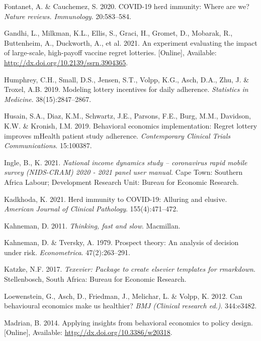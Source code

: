 \documentclass[11pt,preprint, authoryear]{elsarticle}
\numberwithin{equation}{section}
\numberwithin{figure}{section}
\numberwithin{table}{section}
\newlength{\cslhangindent}
\newenvironment{CSLReferences}%
  {\setlength{\parindent}{0pt}%
  \everypar{\setlength{\hangindent}{\cslhangindent}}\ignorespaces}%
  {\par}
\begin{document}
\begin{CSLReferences}{1}{0}
\leavevmode\hypertarget{ref-immun}{}%
Fontanet, A. \& Cauchemez, S. 2020. COVID-19 herd immunity: Where are
we? \emph{Nature reviews. Immunology}. 20:583--584.

\leavevmode\hypertarget{ref-duck}{}%
Gandhi, L., Milkman, K.L., Ellis, S., Graci, H., Gromet, D., Mobarak,
R., Buttenheim, A., Duckworth, A., et al. 2021. An experiment evaluating
the impact of large-scale, high-payoff vaccine regret lotteries.
{[}Online{]}, Available: \url{http://dx.doi.org/10.2139/ssrn.3904365}.

\leavevmode\hypertarget{ref-adhere}{}%
Humphrey, C.H., Small, D.S., Jensen, S.T., Volpp, K.G., Asch, D.A., Zhu,
J. \& Troxel, A.B. 2019. Modeling lottery incentives for daily
adherence. \emph{Statistics in Medicine}. 38(15):2847--2867.

\leavevmode\hypertarget{ref-regr}{}%
Husain, S.A., Diaz, K.M., Schwartz, J.E., Parsons, F.E., Burg, M.M.,
Davidson, K.W. \& Kronish, I.M. 2019. Behavioral economics
implementation: Regret lottery improves mHealth patient study adherence.
\emph{Contemporary Clinical Trials Communications}. 15:100387.

\leavevmode\hypertarget{ref-nids}{}%
Ingle, B., K. 2021. \emph{National income dynamics study -- coronavirus
rapid mobile survey (NIDS-CRAM) 2020 - 2021 panel user manual.} Cape
Town: Southern Africa Labour; Development Research Unit: Bureau for
Economic Research.

\leavevmode\hypertarget{ref-bad}{}%
Kadkhoda, K. 2021. Herd immunity to COVID-19: Alluring and elusive.
\emph{American Journal of Clinical Pathology}. 155(4):471--472.

\leavevmode\hypertarget{ref-fast}{}%
Kahneman, D. 2011. \emph{Thinking, fast and slow}. Macmillan.

\leavevmode\hypertarget{ref-prospect}{}%
Kahneman, D. \& Tversky, A. 1979. Prospect theory: An analysis of
decision under risk. \emph{Econometrica}. 47(2):263--291.

\leavevmode\hypertarget{ref-Texevier}{}%
Katzke, N.F. 2017. \emph{{Texevier}: {P}ackage to create elsevier
templates for rmarkdown}. Stellenbosch, South Africa: Bureau for
Economic Research.

\leavevmode\hypertarget{ref-health}{}%
Loewenstein, G., Asch, D., Friedman, J., Melichar, L. \& Volpp, K. 2012.
Can behavioural economics make us healthier? \emph{BMJ (Clinical
research ed.)}. 344:e3482.

\leavevmode\hypertarget{ref-flu}{}%
Madrian, B. 2014. Applying insights from behavioral economics to policy
design. {[}Online{]}, Available: \url{http://dx.doi.org/10.3386/w20318}.


\end{CSLReferences}
\end{document}
